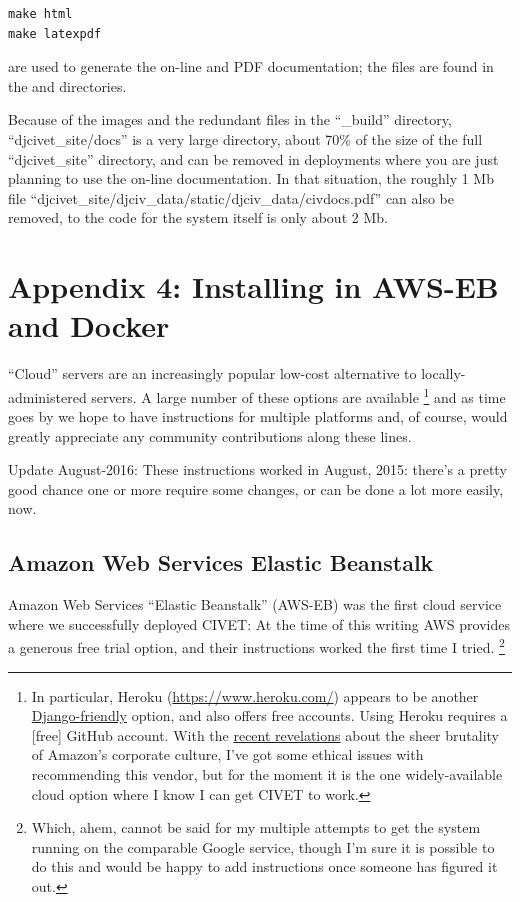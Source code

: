 \documentclass[letterpaper,10pt,english]{sphinxmanual}
\begin{document}
\begin{Verbatim}[commandchars=\\\{\}]
make html
make latexpdf
\end{Verbatim}

are used to generate the on-line and PDF documentation; the files are found in the
 and  directories.

Because of the images and the redundant files in the “\_build” directory,
“djcivet\_site/docs” is a very large directory, about 70\% of the size of the
full “djcivet\_site” directory, and can be removed in deployments where you are
just planning to use the on-line documentation. In that situation, the roughly 1 Mb file
“djcivet\_site/djciv\_data/static/djciv\_data/civdocs.pdf” can also be removed,
to the code for the system itself is only about 2 Mb.


\chapter{Appendix 4: Installing in AWS-EB and Docker}
\label{appendix4::doc}\label{appendix4:appendix-4-installing-in-aws-eb-and-docker}
“Cloud” servers are an increasingly popular low-cost alternative to locally-administered servers. A large number of these
options are available \footnote{
In particular, Heroku (\href{https://www.heroku.com/}{https://www.heroku.com/}) appears to be another
\href{https://devcenter.heroku.com/articles/getting-started-with-django}{Django-friendly} option, and also offers free accounts.
Using Heroku requires a {[}free{]} GitHub account. With the
\href{http://www.nytimes.com/2015/08/16/technology/inside-amazon-wrestling-big-ideas-in-a-bruising-workplace.html}{recent revelations}
about the sheer brutality of Amazon's corporate culture, I've got some
ethical issues with recommending this vendor, but for the moment it is
the one widely-available cloud option where I know I can get CIVET to work.
} and as time goes by we hope to have instructions for multiple platforms and,
of course, would greatly appreciate any community contributions along these lines.

Update August-2016: These instructions worked in August, 2015: there's a pretty good chance one or more require some
changes, or can be done a lot more easily, now.


\section{Amazon Web Services Elastic Beanstalk}
\label{appendix4:amazon-web-services-elastic-beanstalk}
Amazon Web Services “Elastic Beanstalk” (AWS-EB) was the first cloud service where we
successfully deployed CIVET: At the time of this writing AWS provides a generous free trial
option, and their instructions worked the first time I tried. \footnote{
Which, ahem, cannot be said for my multiple attempts to get the system running on the comparable Google service,
though I'm sure it is possible to do this and would be happy to add instructions once someone has figured it
out.
}
\end{document}

